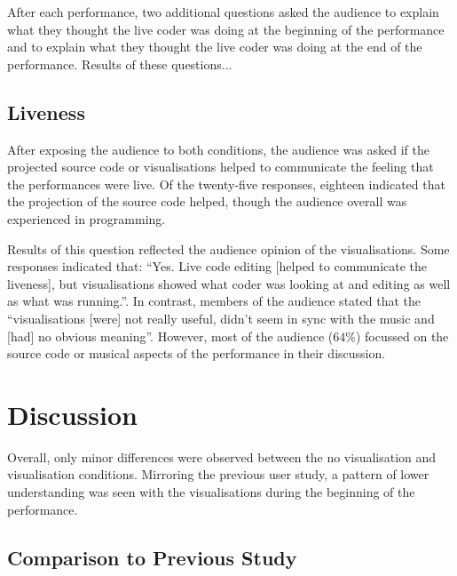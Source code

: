 After each performance, two additional questions asked the audience to explain what they thought the live coder was doing at the beginning of the performance and to explain what they thought the live coder was doing at the end of the performance. Results of these questions... \more

\subsection{Liveness}

After exposing the audience to both conditions, the audience was asked if the projected source code or visualisations helped to communicate the feeling that the performances were live. Of the twenty-five responses, eighteen indicated that the projection of the source code helped, though the audience overall was experienced in programming. 

Results of this question reflected the audience opinion of the visualisations. Some responses indicated that: ``Yes. Live code editing [helped to communicate the liveness], but visualisations showed what coder was looking at and editing as well as what was running.''. In contrast, members of the audience stated that the ``visualisations [were] not really useful, didn't seem in sync with the music and [had] no obvious meaning''. However, most of the audience ($64\%$) focussed on the source code or musical aspects of the performance in their discussion.

\section{Discussion}

Overall, only minor differences were observed between the no visualisation and visualisation conditions. Mirroring the previous user study, a pattern of lower understanding was seen with the visualisations during the beginning of the performance. 

\more


\subsection{Comparison to Previous Study}

